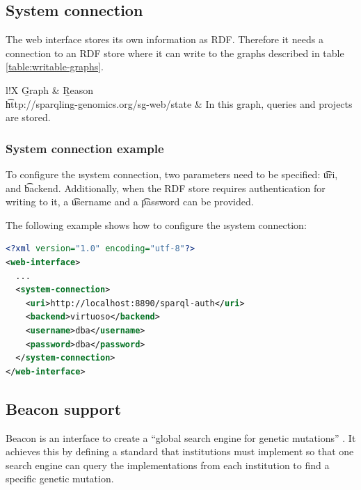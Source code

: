 \subsection{System connection}

  The web interface stores its own information as RDF.  Therefore it needs
  a connection to an RDF store where it can write to the graphs described
  in table \ref{table:writable-graphs}.

  \hypersetup{urlcolor=black}
  \begin{table}[H]
    \begin{tabularx}{\textwidth}{l!{\VRule[-1pt]}X}
      \headrow
      \b{Graph} & \b{Reason}\\
      \evenrow
      \t{http://sparqling-genomics.org/sg-web/state}
      & In this graph, queries and projects are stored.\\
    \end{tabularx}
    \caption{\small Graphs that need to be writable for the web interface.}
    \label{table:writable-graphs}
  \end{table}
  \hypersetup{urlcolor=LinkGray}

\subsubsection{System connection example}

  To configure the \i{system connection}, two parameters need to be
  specified: \t{uri}, and \t{backend}.  Additionally, when the
  RDF store requires authentication for writing to it, a \t{username}
  and a \t{password} can be provided.

  The following example shows how to configure the \i{system connection}:

\begin{lstlisting}[language=XML]
<?xml version="1.0" encoding="utf-8"?>
<web-interface>
  ...
  <system-connection>
    <uri>http://localhost:8890/sparql-auth</uri>
    <backend>virtuoso</backend>
    <username>dba</username>
    <password>dba</password>
  </system-connection>
</web-interface>
\end{lstlisting}

\subsection{Beacon support}
\label{sec:beacon}

  Beacon is an interface to create a ``global search engine for genetic
  mutations'' \citep{beacon-network}.  It achieves this by defining a
  standard that institutions must implement so that one search engine can
  query the implementations from each institution to find a specific
  genetic mutation.

